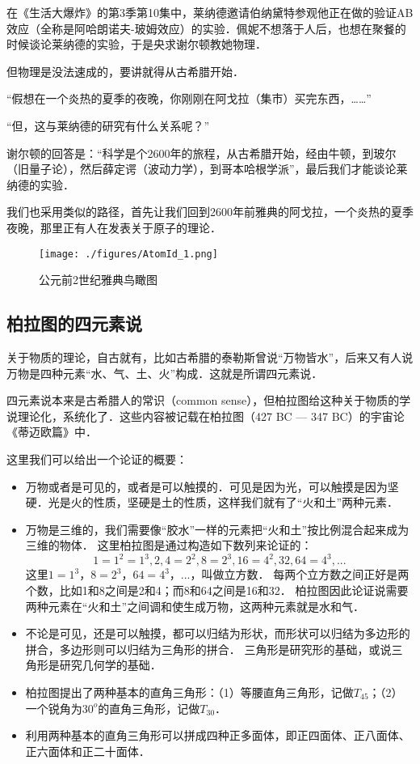 
在《生活大爆炸》的第3季第10集中，莱纳德邀请伯纳黛特参观他正在做的验证AB效应（全称是阿哈朗诺夫-玻姆效应）的实验．佩妮不想落于人后，也想在聚餐的时候谈论莱纳德的实验，于是央求谢尔顿教她物理．

但物理是没法速成的，要讲就得从古希腊开始．

“假想在一个炎热的夏季的夜晚，你刚刚在阿戈拉（集市）买完东西，\dots\dots”

“但，这与莱纳德的研究有什么关系呢？”

谢尔顿的回答是：“科学是个2600年的旅程，从古希腊开始，经由牛顿，到玻尔（旧量子论），然后薛定谔（波动力学），到哥本哈根学派”，最后我们才能谈论莱纳德的实验．

我们也采用类似的路径，首先让我们回到2600年前雅典的阿戈拉，一个炎热的夏季夜晚，那里正有人在发表关于原子的理论．

\begin{figure}[ht]
\centering
\texttt{[image: ./figures/AtomId\_1.png]}
\caption{公元前2世纪雅典鸟瞰图} \label{AtomId_fig1}
\end{figure}

\subsection{柏拉图的四元素说}

关于物质的理论，自古就有，比如古希腊的泰勒斯曾说“万物皆水”，后来又有人说万物是四种元素“水、气、土、火”构成．这就是所谓四元素说．

四元素说本来是古希腊人的常识（common sense），但柏拉图给这种关于物质的学说理论化，系统化了．这些内容被记载在柏拉图（427 BC — 347 BC）的宇宙论《蒂迈欧篇》中．

这里我们可以给出一个论证的概要：

\begin{itemize}
\item 万物或者是可见的，或者是可以触摸的．可见是因为光，可以触摸是因为坚硬．光是火的性质，坚硬是土的性质，这样我们就有了“火和土”两种元素．

\item 万物是三维的，我们需要像“胶水”一样的元素把“火和土”按比例混合起来成为三维的物体． 这里柏拉图是通过构造如下数列来论证的：
\begin{equation}
1=1^2=1^3, 2, 4=2^2, 8=2^3, 16=4^2, 32, 64=4^3,...
\end{equation}
这里$1=1^3$，$8=2^3$，$64=4^3$，...，叫做立方数． 每两个立方数之间正好是两个数，比如1和8之间是2和4；而8和64之间是16和32． 柏拉图因此论证说需要两种元素在“火和土”之间调和使生成万物，这两种元素就是水和气．

\item 不论是可见，还是可以触摸，都可以归结为形状，而形状可以归结为多边形的拼合，多边形则可以归结为三角形的拼合． 三角形是研究形的基础，或说三角形是研究几何学的基础．

\item 柏拉图提出了两种基本的直角三角形：（1）等腰直角三角形，记做$T_{45}$；（2）一个锐角为$30^o$的直角三角形，记做$T_{30}$．

\item 利用两种基本的直角三角形可以拼成四种正多面体，即正四面体、正八面体、正六面体和正二十面体．
\end{itemize}

